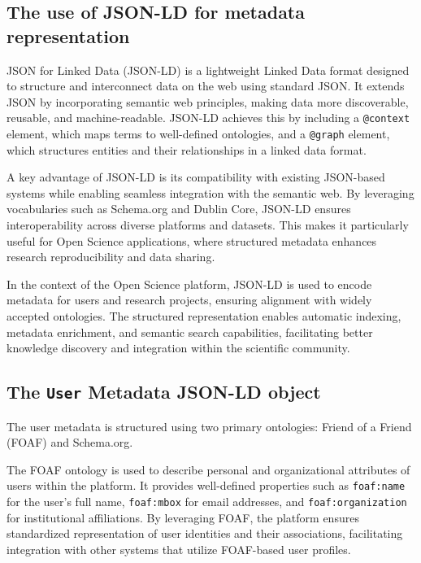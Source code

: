 \documentclass{article}
\begin{document}
\subsection{The use of JSON-LD for metadata representation}

JSON for Linked Data (JSON-LD) is a lightweight Linked Data format designed to structure and interconnect data on the web using standard JSON. It extends JSON by incorporating semantic web principles, making data more discoverable, reusable, and machine-readable. JSON-LD achieves this by including a \texttt{@context} element, which maps terms to well-defined ontologies, and a \texttt{@graph} element, which structures entities and their relationships in a linked data format.

A key advantage of JSON-LD is its compatibility with existing JSON-based systems while enabling seamless integration with the semantic web. By leveraging vocabularies such as Schema.org and Dublin Core, JSON-LD ensures interoperability across diverse platforms and datasets. This makes it particularly useful for Open Science applications, where structured metadata enhances research reproducibility and data sharing.

In the context of the Open Science platform, JSON-LD is used to encode metadata for users and research projects, ensuring alignment with widely accepted ontologies. The structured representation enables automatic indexing, metadata enrichment, and semantic search capabilities, facilitating better knowledge discovery and integration within the scientific community.


\subsection{The \texttt{User} Metadata JSON-LD object}

The user metadata is structured using two primary ontologies: Friend of a Friend (FOAF) and Schema.org.

The FOAF ontology is used to describe personal and organizational attributes of users within the platform. It provides well-defined properties such as \texttt{foaf:name} for the user’s full name, \texttt{foaf:mbox} for email addresses, and \texttt{foaf:organization} for institutional affiliations. By leveraging FOAF, the platform ensures standardized representation of user identities and their associations, facilitating integration with other systems that utilize FOAF-based user profiles.
\end{document}
